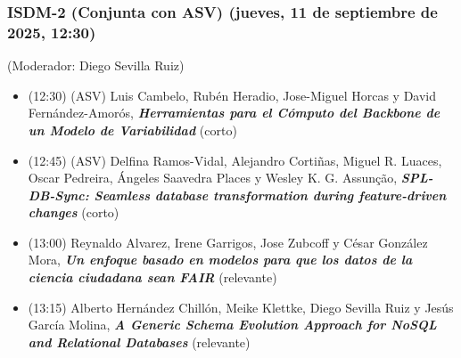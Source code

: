 \begin{frame}
  \frametitle{ISDM-2 (Conjunta con ASV) (jueves, 11 de septiembre de 2025, 12:30)}
{\small (Moderador: Diego Sevilla Ruiz)}
\begin{itemize}

\item (12:30) (ASV) Luis Cambelo, Rubén Heradio, Jose-Miguel Horcas y David Fernández-Amorós, %
      {\bfseries\itshape Herramientas para el Cómputo del Backbone de un Modelo de Variabilidad} %
      (corto)

\item (12:45) (ASV) Delfina Ramos-Vidal, Alejandro Cortiñas, Miguel R. Luaces, Oscar Pedreira, Ángeles Saavedra Places y Wesley K. G. Assunção, %
      {\bfseries\itshape SPL-DB-Sync: Seamless database transformation during feature-driven changes} %
      (corto)

\item (13:00) Reynaldo Alvarez, Irene Garrigos, Jose Zubcoff y César González Mora, %
      {\bfseries\itshape Un enfoque basado en modelos para que los datos de la ciencia ciudadana sean FAIR} %
      (relevante)

\item (13:15) Alberto Hernández Chillón, Meike Klettke, Diego Sevilla Ruiz y Jesús García Molina, %
      {\bfseries\itshape A Generic Schema Evolution Approach for NoSQL and Relational Databases} %
      (relevante)

\end{itemize}
\end{frame}